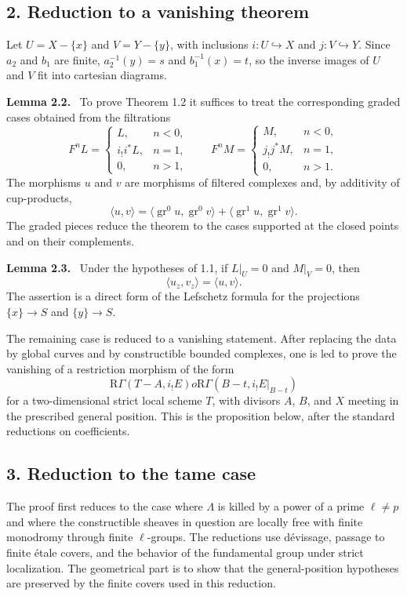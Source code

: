 \documentclass[11pt]{article}
\theoremstyle{plain}
\theoremstyle{definition}
\theoremstyle{remark}
\newenvironment{statement}[1]{\par\medskip\noindent\textbf{#1.}\ }{\par\medskip}
\newcommand{\R}{\mathrm R}
\begin{document}
\subsection*{2. Reduction to a vanishing theorem}
Let $U=X-\{x\}$ and $V=Y-\{y\}$, with inclusions $i:U\hookrightarrow X$ and $j:V\hookrightarrow Y$. Since $a_2$ and $b_1$ are finite, $a_2^{-1}(y)=s$ and $b_1^{-1}(x)=t$, so the inverse images of $U$ and $V$ fit into cartesian diagrams.

\begin{statement}{Lemma 2.2}
To prove Theorem 1.2 it suffices to treat the corresponding graded cases obtained from the filtrations
\[
F^nL=\begin{cases}L,& n<0,\\ i_!i^*L,& n=1,\\0,& n>1,
\end{cases}
\qquad
F^nM=\begin{cases}M,& n<0,\\ j_!j^*M,& n=1,\\0,& n>1.
\end{cases}
\]
The morphisms $u$ and $v$ are morphisms of filtered complexes and, by additivity of cup-products,
\[
   \langle u,v\rangle=
   \langle \operatorname{gr}^0u,\operatorname{gr}^0v\rangle+
   \langle \operatorname{gr}^1u,\operatorname{gr}^1v\rangle.
\]
The graded pieces reduce the theorem to the cases supported at the closed points and on their complements.
\end{statement}

\begin{statement}{Lemma 2.3}
Under the hypotheses of 1.1, if $L|_U=0$ and $M|_V=0$, then
\[
   \langle u_z,v_z\rangle=\langle u,v\rangle.
\]
The assertion is a direct form of the Lefschetz formula for the projections $\{x\}\to S$ and $\{y\}\to S$.
\end{statement}

The remaining case is reduced to a vanishing statement. After replacing the data by global curves and by constructible bounded complexes, one is led to prove the vanishing of a restriction morphism of the form
\[
   \R\Gamma(T-A,i_!E)	o \R\Gamma(B-t,i_!E|_{B-t})
\]
for a two-dimensional strict local scheme $T$, with divisors $A$, $B$, and $X$ meeting in the prescribed general position. This is the proposition below, after the standard reductions on coefficients.

\subsection*{3. Reduction to the tame case}
The proof first reduces to the case where $\Lambda$ is killed by a power of a prime $\ell\ne p$ and where the constructible sheaves in question are locally free with finite monodromy through finite $\ell$-groups. The reductions use dévissage, passage to finite étale covers, and the behavior of the fundamental group under strict localization. The geometrical part is to show that the general-position hypotheses are preserved by the finite covers used in this reduction.
\end{document}
